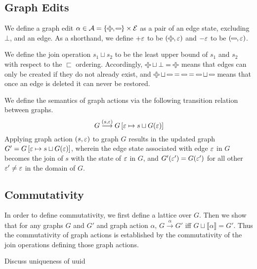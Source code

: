 \subsection{Graph Edits}%
\label{sub:Graph Edits}

We define a graph edit $\alpha \in \A = \left\{\Plus, \Minus\right\} \times \E$
as a pair of an edge state, excluding $\bot$, and an edge. As a shorthand, we
define $+\varepsilon$ to be $(\Plus, \e)$ and $-\varepsilon$ to be $(\Minus, \e)$.

We define the join operation $s_1 \sqcup s_2$ to be the least upper bound of
$s_1$ and $s_2$ with respect to the $\sqsubset$ ordering. Accordingly, $\Plus
\sqcup \bot = \Plus$ means that edges can only be created if they do not already
exist, and $\Plus \sqcup \Minus = \Minus = \Minus \sqcup \Minus$ means that once
an edge is deleted it can never be restored.

We define the semantics of graph actions via the following transition relation
between graphs.
\[
  G \overset{(s,\varepsilon)}{\longrightarrow} G\left[ \varepsilon \mapsto s \sqcup G(\varepsilon) \right]
\]
Applying graph action $\left(s, \varepsilon\right)$ to graph $G$ results in the
updated graph $G' = G\left[\varepsilon \mapsto s \sqcup G(\varepsilon) \right]$, wherein the edge
state associated with edge $\varepsilon$ in $G$ becomes the join of $s$ with the state of
$\varepsilon$ in $G$, and $G'(\varepsilon') = G(\varepsilon')$ for all other $\varepsilon' \ne \varepsilon$ in the domain of
$G$.



\subsection{Commutativity}%
\label{sub:Commutativity:formal}

In order to define commutativity, we first define a lattice over $G$.
Then we show that for any graphs $G$ and $G'$ and graph action $\alpha$,
$G \overset{\alpha}\rightarrow G'$
iff $G \sqcup \llbracket\alpha\rrbracket = G'$.
Thus the commutativity of graph actions is established
by the commutativity of the join operations defining those graph actions.

Discuss uniqueness of uuid

